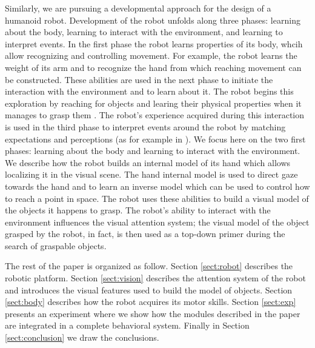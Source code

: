 Similarly, we are pursuing a developmental approach for the design of a humanoid robot. Development of the robot unfolds along three phases: learning about the body, learning to interact with the environment, and learning to interpret events. In the first phase the robot learns properties of its body, whcih allow recognizing and controlling movement. For example, the robot learns the weight of its arm and to recognize the hand from which reaching movement can be constructed. These abilities are used in the next phase to initiate the interaction with the environment and to learn about it. The robot begins this exploration by reaching for objects and learing their physical properties when it manages to grasp them \cite{natale04learning,natale05exploring,torres-jara05tapping}. The robot's experience acquired during this interaction is used in the third phase to interpret events around the robot by matching expectations and perceptions (as for example in \cite{metta03early}). We focus here on the two first phases: learning about the body and learning to interact with the environment. We describe how the robot builds an internal model of its hand which allows localizing it in the visual scene. The hand internal model is used to direct gaze towards the hand and to learn an inverse model which can be used to control how to reach a point in space. The robot uses these abilities to build a visual model of the objects it happens to grasp. The robot's ability to interact with the environment influences the visual attention system; the visual model of the object grasped by the robot, in fact, is then used as a top-down primer during the search of graspable objects.

The rest of the paper is organized as follow. Section \ref{sect:robot} describes the robotic platform. Section \ref{sect:vision} describes the attention system of the robot and introduces the visual features used to build the model of objects. Section \ref{sect:body} describes how the robot acquires its motor skills. Section \ref{sect:exp} presents an experiment where we show how the modules described in the paper are integrated in a complete behavioral system. Finally in Section \ref{sect:conclusion} we draw the conclusions.
